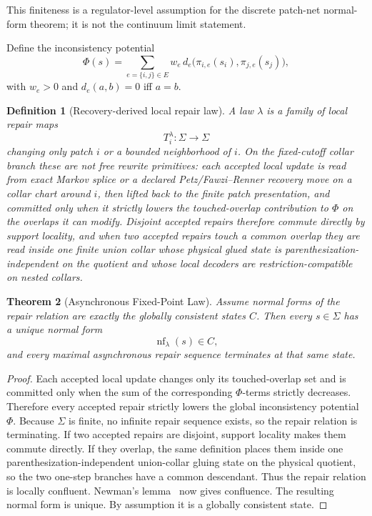 \documentclass[11pt]{article}
\newtheorem{theorem}{Theorem}[section]
\newtheorem{definition}[theorem]{Definition}
\newcommand{\nf}{\operatorname{nf}}
\begin{document}
This finiteness is a regulator-level assumption for the discrete patch-net normal-form theorem; it is not the continuum limit statement.

Define the inconsistency potential
\[
\Phi(s)=\sum_{e=\{i,j\}\in E}w_e\, d_e\!\bigl(\pi_{i,e}(s_i),\pi_{j,e}(s_j)\bigr),
\]
with $w_e>0$ and $d_e(a,b)=0$ iff $a=b$.

\begin{definition}[Recovery-derived local repair law]
A law $\lambda$ is a family of local repair maps
\[
T_i^\lambda:\Sigma\to\Sigma
\]
changing only patch $i$ or a bounded neighborhood of $i$. On the fixed-cutoff collar branch these
are not free rewrite primitives: each accepted local update is read from exact Markov splice or a
declared Petz/Fawzi--Renner recovery move on a collar chart around \(i\), then lifted back to the
finite patch presentation, and committed only when it strictly lowers the touched-overlap
contribution to \(\Phi\) on the overlaps it can modify. Disjoint accepted repairs therefore
commute directly by support locality, and when two accepted repairs touch a common overlap they are read inside one
finite union collar whose physical glued state is parenthesization-independent on the quotient and
whose local decoders are restriction-compatible on nested collars.
\end{definition}

\begin{theorem}[Asynchronous Fixed-Point Law]\label{thm:confluence}
Assume normal forms of the repair relation are exactly the globally consistent states $C$.
Then every $s\in\Sigma$ has a unique normal form
\[
\nf_\lambda(s)\in C,
\]
and every maximal asynchronous repair sequence terminates at that same state.
\end{theorem}

\begin{proof}
Each accepted local update changes only its touched-overlap set and is committed only when the sum
of the corresponding \(\Phi\)-terms strictly decreases. Therefore every accepted repair strictly
lowers the global inconsistency potential \(\Phi\). Because \(\Sigma\) is finite, no infinite
repair sequence exists, so the repair relation is terminating. If two accepted repairs are
disjoint, support locality makes them commute directly. If they overlap, the same definition places
them inside one parenthesization-independent union-collar gluing state on the physical quotient,
so the two one-step branches have a common descendant. Thus the repair relation is locally
confluent. Newman's lemma~\cite{newman42} now gives confluence. The resulting normal form is
unique. By assumption it is a globally consistent state.
\end{proof}
\end{document}
